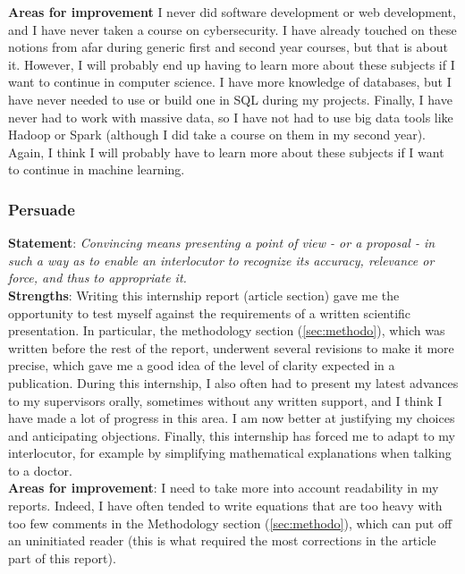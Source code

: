 \documentclass[preprint,12pt]{elsarticle}
\begin{document}
\noindent \textbf{Areas for improvement} I never did software development or web development, and I have never taken a course on cybersecurity. I have already touched on these notions from afar during generic first and second year courses, but that is about it. However, I will probably end up having to learn more about these subjects if I want to continue in computer science. I have more knowledge of databases, but I have never needed to use or build one in SQL during my projects. Finally, I have never had to work with massive data, so I have not had to use big data tools like Hadoop or Spark (although I did take a course on them in my second year). Again, I think I will probably have to learn more about these subjects if I want to continue in machine learning.

\subsubsection{Persuade}

\noindent \textbf{Statement}: \textit{Convincing means presenting a point of view - or a proposal - in such a way as to enable an interlocutor to recognize its accuracy, relevance or force, and thus to appropriate it.}\\[3 pt]

\noindent \textbf{Strengths}: Writing this internship report (article section) gave me the opportunity to test myself against the requirements of a written scientific presentation. In particular, the methodology section (\ref{sec:methodo}), which was written before the rest of the report, underwent several revisions to make it more precise, which gave me a good idea of the level of clarity expected in a publication. During this internship, I also often had to present my latest advances to my supervisors orally, sometimes without any written support, and I think I have made a lot of progress in this area. I am now better at justifying my choices and anticipating objections. Finally, this internship has forced me to adapt to my interlocutor, for example by simplifying mathematical explanations when talking to a doctor.\\[3 pt]

\noindent \textbf{Areas for improvement}: I need to take more into account readability in my reports. Indeed, I have often tended to write equations that are too heavy with too few comments in the Methodology section (\ref{sec:methodo}), which can put off an uninitiated reader (this is what required the most corrections in the article part of this report).
\end{document}
